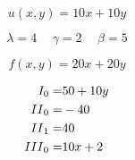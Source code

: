 \documentclass[12pt,a4paper]{article}
\newcommand{\romannumeralcaps}[1]{\MakeUppercase{\romannumeral #1}}
\begin{document}
    \thispagestyle{empty}

    \Large

    \[ u(x,y) = 10x + 10y \]

    \[
    \lambda = 4 \hspace{15pt}
    \gamma  = 2 \hspace{15pt}
    \beta   = 5
    \]

    \[ f(x,y) = 20x + 20y \]

    \begin{eqnarray*}
        \romannumeralcaps{1}_0 = & 50 + 10y \\
        \romannumeralcaps{2}_0 = & -40      \\
        \romannumeralcaps{2}_1 = & 40       \\
        \romannumeralcaps{3}_0 = & 10x + 2
    \end{eqnarray*}
\end{document}
